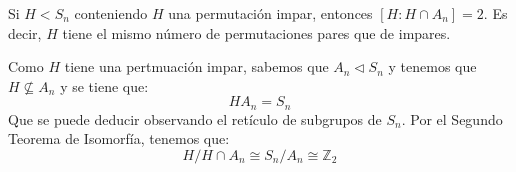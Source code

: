 \begin{ejemplo} %
    Si $H<S_n$ conteniendo $H$ una permutación impar, entonces $[H:H\cap A_n]=2$. Es decir, $H$ tiene el mismo número de permutaciones pares que de impares.

    Como $H$ tiene una pertmuación impar, sabemos que $A_n\lhd S_n$ y tenemos que $H\nsubseteq A_n$ y se tiene que:
    \begin{equation*}
        HA_n = S_n
    \end{equation*}
    Que se puede deducir observando el retículo de subgrupos de $S_n$. Por el Segundo Teorema de Isomorfía, tenemos que:
    \begin{equation*}
        H/H\cap A_n \cong S_n/A_n \cong \mathbb{Z}_2
    \end{equation*}
\end{ejemplo}

